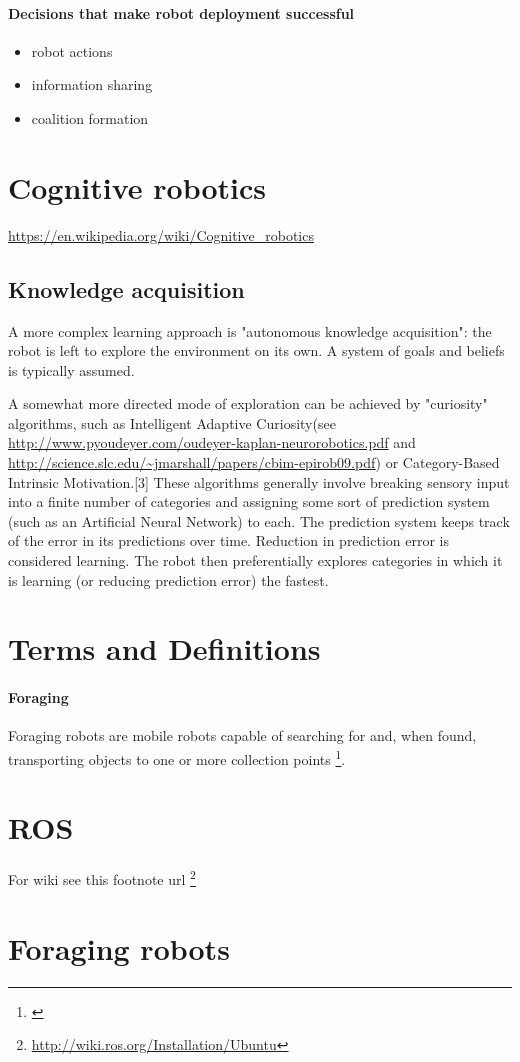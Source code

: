 \documentclass{article}
\begin{document}
   		\paragraph{Decisions that make robot deployment successful}
   			\begin{itemize}
   				\item  robot actions
   				\item  information sharing
   				\item  coalition formation
   			\end{itemize}
   	\section{Cognitive robotics}
   	\url{https://en.wikipedia.org/wiki/Cognitive_robotics}	
   		\subsection{Knowledge acquisition}
   		A more complex learning approach is "autonomous knowledge acquisition": the robot is left to explore the environment on its own. A system of goals and beliefs is typically assumed.
   		
   		A somewhat more directed mode of exploration can be achieved by "curiosity" algorithms, such as Intelligent Adaptive Curiosity(see \url{http://www.pyoudeyer.com/oudeyer-kaplan-neurorobotics.pdf} and \url{http://science.slc.edu/~jmarshall/papers/cbim-epirob09.pdf}) or Category-Based Intrinsic Motivation.[3] These algorithms generally involve breaking sensory input into a finite number of categories and assigning some sort of prediction system (such as an Artificial Neural Network) to each. The prediction system keeps track of the error in its predictions over time. Reduction in prediction error is considered learning. The robot then preferentially explores categories in which it is learning (or reducing prediction error) the fastest.
   		
 	\section{Terms and Definitions} 
 		\paragraph{Foraging} Foraging robots are mobile robots capable of searching for and, when found, transporting objects to one or more collection points \footnote{\cite{https://www.researchgate.net/publication/255386609_Foraging_Robots}}.  
 		
	\section{ROS}
		For wiki see this footnote url \footnote{\url{http://wiki.ros.org/Installation/Ubuntu}}
	\section{Foraging robots}
	
 		
	
\end{document}
